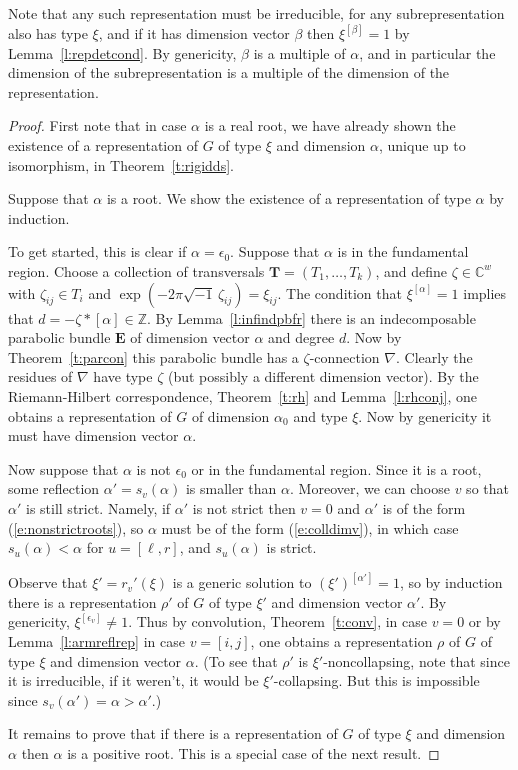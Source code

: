 \documentclass{amsart}
\theoremstyle{plain}
\theoremstyle{definition}
\theoremstyle{remark}
\newcommand{\C}{\mathbb{C}}
\newcommand{\Z}{\mathbb{Z}}
\newcommand{\E}{\mathbf{E}}
\begin{document}
Note that any such representation must be irreducible,
for any subrepresentation also has type $\xi$, and if it has dimension vector
$\beta$ then $\xi^{[\beta]}=1$ by Lemma~\ref{l:repdetcond}.
By genericity, $\beta$ is a multiple of $\alpha$, and in particular the
dimension of the subrepresentation is a multiple of the dimension of the
representation.


\begin{proof}
First note that in case $\alpha$ is a real root, we have already shown the
existence of a representation of $G$ of type $\xi$ and dimension $\alpha$,
unique up to isomorphism, in Theorem~\ref{t:rigidds}.

Suppose that $\alpha$ is a root. We show the existence of a representation of type $\alpha$
by induction.

To get started, this is clear if $\alpha=\epsilon_0$.
Suppose that $\alpha$ is in the fundamental region. Choose a collection of
transversals $\mathbf{T}=(T_1,\dots,T_k)$, and define $\zeta\in\C^w$ with
$\zeta_{ij}\in T_i$ and $\exp(-2\pi\sqrt{-1}\, \zeta_{ij})=\xi_{ij}$.
The condition that $\xi^{[\alpha]}=1$ implies that $d=-\zeta*[\alpha]\in\Z$.
By Lemma~\ref{l:infindpbfr} there is an indecomposable parabolic bundle
$\E$ of dimension vector $\alpha$ and degree $d$.
Now by Theorem~\ref{t:parcon} this parabolic bundle has a $\zeta$-connection
$\nabla$. Clearly the residues of $\nabla$ have type $\zeta$
(but possibly a different dimension vector). By the Riemann-Hilbert
correspondence, Theorem~\ref{t:rh} and Lemma~\ref{l:rhconj}, one obtains a
representation of $G$ of dimension $\alpha_0$ and type $\xi$.
Now by genericity it must have dimension vector $\alpha$.

Now suppose that $\alpha$ is not $\epsilon_0$ or in the fundamental region.
Since it is a root, some reflection $\alpha'=s_v(\alpha)$ is
smaller than $\alpha$. Moreover, we can choose $v$ so that $\alpha'$ is still
strict. Namely, if $\alpha'$ is not strict then $v=0$ and $\alpha'$ is of the form (\ref{e:nonstrictroots}),
so $\alpha$ must be of the form (\ref{e:colldimv}), in which case $s_u(\alpha)<\alpha$
for $u=[\ell,r]$, and $s_u(\alpha)$ is strict.

Observe that $\xi'=r_v'(\xi)$ is
a generic solution to $(\xi')^{[\alpha']}=1$, so by induction there is a
representation $\rho'$ of $G$ of type $\xi'$ and dimension vector $\alpha'$.
By genericity, $\xi^{[\epsilon_v]}\neq 1$. Thus by convolution,
Theorem~\ref{t:conv}, in case $v=0$ or by Lemma~\ref{l:armreflrep} in case $v=[i,j]$,
one obtains a representation $\rho$ of $G$ of type $\xi$ and dimension vector $\alpha$.
(To see that $\rho'$ is $\xi'$-noncollapsing, note that since it is irreducible,
if it weren't, it would be $\xi'$-collapsing. But this is impossible since
$s_v(\alpha')=\alpha>\alpha'$.)

It remains to prove that if there is a representation of $G$ of type $\xi$
and dimension $\alpha$ then $\alpha$ is a positive root. This is a special
case of the next result.
\end{proof}
\end{document}
